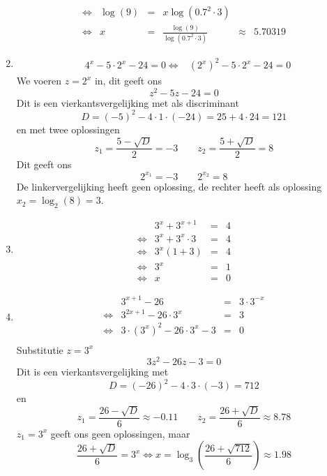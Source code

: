 \begin{oef}
\begin{opl}
\begin{enumerate}
\[\begin{array}{rrclcl}
            \iff & \log(9) & = & x \log(0.7^2 \cdot 3) \\
            \iff & x & = & \frac{\log(9)}{\log(0.7^2 \cdot 3)} & \approx & 5.70319
          \end{array}
        \]
  \item \[
          \begin{array}{rrclcl}
                 & 4^x - 5 \cdot 2^x - 24 = 0
            \iff & (2^x)^2 - 5 \cdot 2^x - 24 = 0
          \end{array}
        \]
        We voeren $z = 2^x$ in, dit geeft ons
        \[
          z^2 - 5z - 24 = 0
        \]
        Dit is een vierkantsvergelijking met als discriminant
        \[
          D = (-5)^2 - 4 \cdot 1 \cdot (-24) = 25 + 4 \cdot 24 = 121
        \]
        en met twee oplossingen
        \[
          z_1 = \frac{5 - \sqrt{D}}{2} = -3 \qquad z_2 = \frac{5+\sqrt{D}}{2} = 8
        \]
        Dit geeft ons
        \[
          2^{x_1} = -3 \qquad 2^{x_2} = 8
        \]
        De linkervergelijking heeft geen oplossing, de rechter heeft als oplossing $x_2 = \log_2(8) = 3$.
  \item \[
          \begin{array}{rrclcl}
                 & 3^x+3^{x+1} & = & 4 \\
            \iff & 3^x+3^x\cdot3 & = & 4 \\
            \iff & 3^x(1+3) & = & 4 \\
            \iff & 3^x & = & 1 \\
            \iff & x & = & 0
          \end{array}
        \]
  \item \[
          \begin{array}{rrclcl}
                 & 3^{x+1}-26 & = & 3 \cdot 3^{-x} \\
            \iff & 3^{2x+1}-26 \cdot 3^x & = & 3 \\
            \iff & 3 \cdot (3^x)^2-26 \cdot 3^x - 3 & = & 0 \\
          \end{array}
        \]
        Substitutie $z = 3^x$
        \[
          3 z^2 - 26 z - 3 = 0
        \]
        Dit is een vierkantsvergelijking met
        \[
          D = (-26)^2 - 4 \cdot 3 \cdot (-3) = 712
        \]
        en
        \[
          z_1 = \frac{26 - \sqrt{D}}{6} \approx -0.11 \qquad z_2 = \frac{26 + \sqrt{D}}{6} \approx 8.78
        \]
        $z_1 = 3^x$ geeft ons geen oplossingen, maar
        \[
          \frac{26 + \sqrt{D}}{6} = 3^x \iff x = \log_3\left( \frac{26 + \sqrt{712}}{6} \right) \approx 1.98
\]
\end{enumerate}
\end{opl}
\end{oef}
